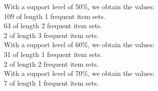 \documentclass[12pt]{article}
\begin{document}
\noindent With a support level of 50\%, we obtain the values: \\
109 of length 1 frequent item sets. \\
63 of length 2 frequent item sets. \\
2 of length 3 frequent item sets. \\

\noindent With a support level of 60\%, we obtain the values: \\
31 of length 1 frequent item sets. \\
2 of length 2 frequent item sets. \\

\noindent With a support level of 70\%, we obtain the values: \\
7 of length 1 frequent item sets. \\
\end{document}
